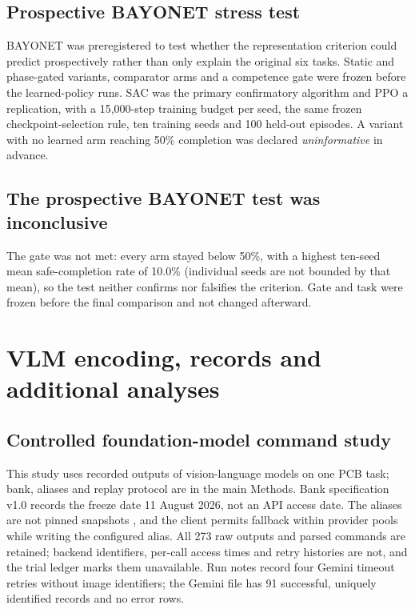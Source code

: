 \documentclass[10pt]{article}
\begin{document}
\subsection{Prospective BAYONET stress test}

BAYONET was preregistered to test whether the representation criterion could
predict prospectively rather than only explain the original six tasks. Static
and phase-gated variants, comparator arms and a competence gate were frozen
before the learned-policy runs. SAC was the primary confirmatory algorithm and
PPO a replication, with a 15,000-step training budget per seed, the same frozen
checkpoint-selection rule, ten training seeds and 100 held-out episodes. A
variant with no learned arm reaching 50\% completion was declared
\emph{uninformative} in advance.


\subsection{The prospective BAYONET test was inconclusive}

The gate was not met: every arm stayed below 50\%, with a highest ten-seed
mean safe-completion rate of 10.0\% (individual seeds are not bounded by that
mean), so the test neither confirms nor falsifies the criterion. Gate and task were frozen before the final comparison and not changed afterward.


\section{VLM encoding, records and additional analyses}
\subsection{Controlled foundation-model command study}
\label{sec:si-vlm-method}

This study uses recorded outputs of vision-language models on one PCB task; bank, aliases and replay protocol are in the
main Methods. Bank specification v1.0 records the freeze date 11 August 2026,
not an API access date. The aliases are not pinned snapshots
\cite{ref36,ref37,ref38}, and the client permits fallback within provider pools while writing the
configured alias. All 273 raw outputs and parsed commands are retained;
backend identifiers, per-call access times and retry histories are not, and
the trial ledger marks them unavailable. Run notes record four Gemini timeout retries without image identifiers; the Gemini file
has 91 successful, uniquely identified records and no error rows.
\end{document}
